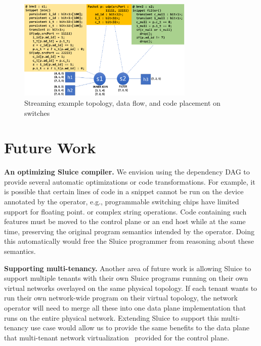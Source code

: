 \begin{figure}[tp]
\centering
\includegraphics[width=84mm]{figures/streaming_example}
\caption{Streaming example topology, data flow, and code placement on switches}
\vspace{-5mm}
\end{figure}
\vspace{-3mm}


\section{Future Work}
\textbf{An optimizing Sluice compiler.} We envision using the dependency DAG to
provide several automatic optimizations or code transformations. For example,
it is possible that certain lines of code in a snippet cannot be run on the
device annotated by the operator, e.g., programmable switching chips have
limited support for floating point. or complex string operations. Code
containing such features must be moved to the control plane or an end host while at the same time, preserving the original program semantics intended by the operator. Doing this automatically would free the Sluice programmer from reasoning about these semantics.

\textbf{Supporting multi-tenancy.} Another area of future work is allowing
Sluice to support multiple tenants with their own Sluice
programs running on their own virtual networks overlayed on the same physical
topology. If each tenant wants to run their own network-wide program on their
virtual topology, the network operator will need to merge all these into one
data plane implementation that runs on the entire physical network. Extending
Sluice to support this multi-tenancy use case would allow us to provide the
same benefits to the data plane that multi-tenant network
virtualization~\cite{multitenant} provided for the control plane.\\\\\\\\\\\\



